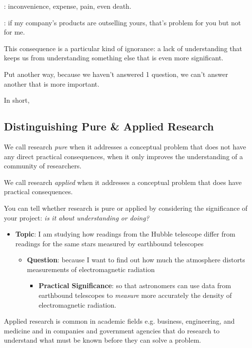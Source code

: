 \documentclass[oneside]{book}
\numberwithin{equation}{section}
\begin{document}
: inconvenience, expense, pain, even death.

: if my company's products are outselling yours, that's problem for you but not for me.

%


This consequence is a particular kind of ignorance: a lack of understanding that keeps us from understanding something else that is even more significant.

Put another way, because we haven't answered 1 question, we can't answer another that is more important.

%
In short, 


\subsection{Distinguishing Pure \& Applied Research}
We call research \textit{pure} when it addresses a conceptual problem that does not have any direct practical consequences, when it only improves the understanding of a community of researchers.

We call research \textit{applied} when it addresses a conceptual problem that does have practical consequences.

You can tell whether research is pure or applied by considering the significance of your project: \textit{is it about understanding or doing?}
\begin{itemize}
    \item[1.] \textbf{Topic}: I am studying how readings from the Hubble telescope differ from readings for the same stars measured by earthbound telescopes
    \begin{itemize}
        \item[2.] \textbf{Question}: because I want to find out how much the atmosphere distorts measurements of electromagnetic radiation
        \begin{itemize}
            \item[3.] \textbf{Practical Significance}: so that astronomers can use data from earthbound telescopes to \textit{measure} more accurately the density of electromagnetic radiation.
        \end{itemize}
    \end{itemize}
\end{itemize}
Applied research is common in academic fields e.g. business, engineering, and medicine and in companies and government agencies that do research to understand what must be known before they can solve a problem.
\end{document}
